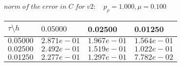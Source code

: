 
 $norm\;of\;the\;error\;in\;C\;for\;v2: \quad p_{\rho}=1.000, \mu = 0.100 $ \\ 
\begin{tabular}{|p{0.6in}|p{1.2in}|p{1.2in}|p{1.2in}|} \hline
$\tau\setminus h$ & $0.05000 $ & 0.02500 & 0.01250 \\ \hline
$0.05000$ & $2.871e-01$ &$1.967e-01$ &$1.564e-01$  \\ \hline
$0.02500$ & $2.492e-01$ &$1.519e-01$ &$1.022e-01$  \\ \hline
$0.01250$ & $2.277e-01$ &$1.297e-01$ &$7.782e-02$  \\ \hline
\end{tabular}\\[20pt]
